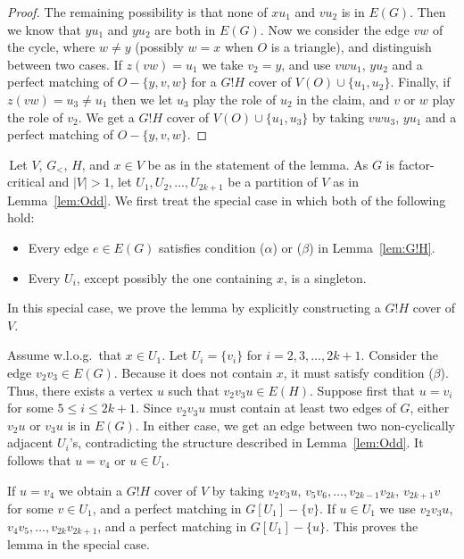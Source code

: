 \documentclass[10pt,a4paper]{amsart}
\begin{document}
\begin{proof}
The remaining possibility is that none of $xu_1$ and $vu_2$ is in $E(G)$. Then we know that $yu_1$ and $yu_2$ are both in $E(G)$. Now we consider the edge $vw$ of the cycle, where $w \ne y$ (possibly $w = x$ when $O$ is a triangle), and distinguish between two cases. If $z(vw) = u_1$ we take $v_2 = y$, and use $vwu_1$, $yu_2$ and a perfect matching of $O - \{y, v, w\}$ for a $G!H$ cover of $V(O) \cup \{u_1, u_2\}$. Finally, if $z(vw) = u_3 \ne u_1$ then we let $u_3$ play the role of $u_2$ in the claim, and $v$ or $w$ play the role of $v_2$. We get a $G!H$ cover of $V(O) \cup \{u_1, u_3\}$ by taking $vwu_3$, $yu_1$ and a perfect matching of $O - \{y, v, w\}$.
\end{proof}

\vspace{10pt}

 \,Let $V$, $G_<$, $H$, and $x \in V$ be as in the statement of the lemma. As $G$ is factor-critical and $|V| > 1$, let $U_1, U_2, \ldots , U_{2k+1}$ be a partition of $V$ as in Lemma~\ref{lem:Odd}. We first treat the special case in which both of the following hold:
\begin{itemize}
    \item Every edge $e \in E(G)$ satisfies condition ($\alpha$) or ($\beta$) in Lemma~\ref{lem:G!H}.
    \item Every $U_i$, except possibly the one containing $x$, is a singleton.
\end{itemize}
In this special case, we prove the lemma by explicitly constructing a $G!H$ cover of $V$.

Assume w.l.o.g.\ that $x \in U_1$. Let $U_i = \{v_i\}$ for $i=2,3, \ldots , 2k+1$. Consider the edge $v_2v_3 \in E(G)$. Because it does not contain $x$, it must satisfy condition ($\beta$). Thus, there exists a vertex $u$ such that $v_2v_3u \in E(H)$. Suppose first that $u = v_i$ for some $5 \le i \le 2k+1$. Since $v_2v_3u$ must contain at least two edges of $G$, either $v_2u$ or $v_3u$ is in $E(G)$. In either case, we get an edge between two non-cyclically adjacent $U_i$'s, contradicting the structure described in Lemma~\ref{lem:Odd}. It follows that $u = v_4$ or $u \in U_1$.

If $u = v_4$ we obtain a $G!H$ cover of $V$ by taking $v_2v_3u$, $v_5v_6, \ldots , v_{2k-1}v_{2k}$, $v_{2k+1}v$ for some $v \in U_1$, and a perfect matching in $G[U_1] - \{v\}$. If $u \in U_1$ we use $v_2v_3u$, $v_4v_5, \ldots , v_{2k}v_{2k+1}$, and a perfect matching in $G[U_1] - \{u\}$. This proves the lemma in the special case.
\end{document}
